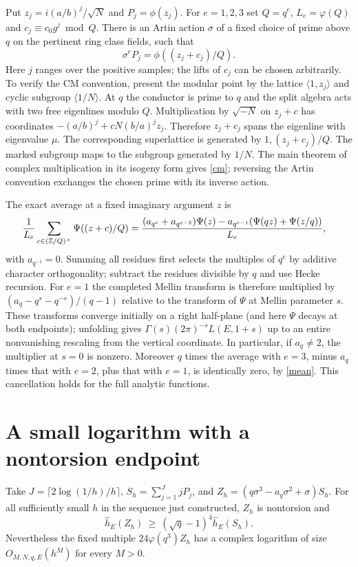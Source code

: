 \documentclass[11pt]{article}
\begin{document}
Put $z_j=i(a/b)^j/\sqrt N$ and $P_j=\phi(z_j)$. For $e=1,2,3$ set $Q=q^e$, $L_e=\varphi(Q)$ and $c_j\equiv c_0g^j\bmod Q$. There is an Artin action $\sigma$ of a fixed choice of prime above $q$ on the pertinent ring class fields, such that
\begin{equation}\label{cm}
 \sigma^eP_j=\phi((z_j+c_j)/Q).
\end{equation}
Here $j$ ranges over the positive samples; the lifts of $c_j$ can be chosen arbitrarily. To verify the CM convention, present the modular point by the lattice $\langle1,z_j\rangle$ and cyclic subgroup $\langle1/N\rangle$. At $q$ the conductor is prime to $q$ and the split algebra acts with two free eigenlines modulo $Q$. Multiplication by $\sqrt{-N}$ on $z_j+c$ has coordinates $-(a/b)^j+cN(b/a)^j z_j$. Therefore $z_j+c_j$ spans the eigenline with eigenvalue $\mu$. The corresponding superlattice is generated by $1,(z_j+c_j)/Q$. The marked subgroup maps to the subgroup generated by $1/N$. The main theorem of complex multiplication in its isogeny form \cite{Darmon} gives \eqref{cm}; reversing the Artin convention exchanges the chosen prime with its inverse action.

The exact average at a fixed imaginary argument $z$ is
\begin{align}
\frac1{L_e}\sum_{c\in(\mathbb Z/Q)^\times}\Psi((z+c)/Q)
&=\frac{(a_{q^e}+a_{q^{e-2}})\Psi(z)
 -a_{q^{e-1}}(\Psi(qz)+\Psi(z/q))}{L_e},
\label{mean}
\end{align}
with $a_{q^{-1}}=0$. Summing all residues first selects the multiples of $q^e$ by additive character orthogonality; subtract the residues divisible by $q$ and use Hecke recursion. For $e=1$ the completed Mellin transform is therefore multiplied by $(a_q-q^s-q^{-s})/(q-1)$ relative to the transform of $\Psi$ at Mellin parameter $s$. These transforms converge initially on a right half-plane (and here $\Psi$ decays at both endpoints); unfolding gives $\Gamma(s)(2\pi)^{-s}L(E,1+s)$ up to an entire nonvanishing rescaling from the vertical coordinate. In particular, if $a_q\ne2$, the multiplier at $s=0$ is nonzero. Moreover $q$ times the average with $e=3$, minus $a_q$ times that with $e=2$, plus that with $e=1$, is identically zero, by \eqref{mean}. This cancellation holds for the full analytic functions.

\section{A small logarithm with a nontorsion endpoint}
Take $J=\lceil2\log(1/h)/h\rceil$, $S_h=\sum_{j=1}^J jP_j$, and
$Z_h=(q\sigma^3-a_q\sigma^2+\sigma)S_h$. For all sufficiently small $h$ in the sequence just constructed, $Z_h$ is nontorsion and
\[
 \widehat h_E(Z_h)\ \ge\ (\sqrt q-1)^4\widehat h_E(S_h).
\]
Nevertheless the fixed multiple $24\varphi(q^3)Z_h$ has a complex logarithm of size $O_{M,N,q,E}(h^M)$ for every $M>0$.
\end{document}
